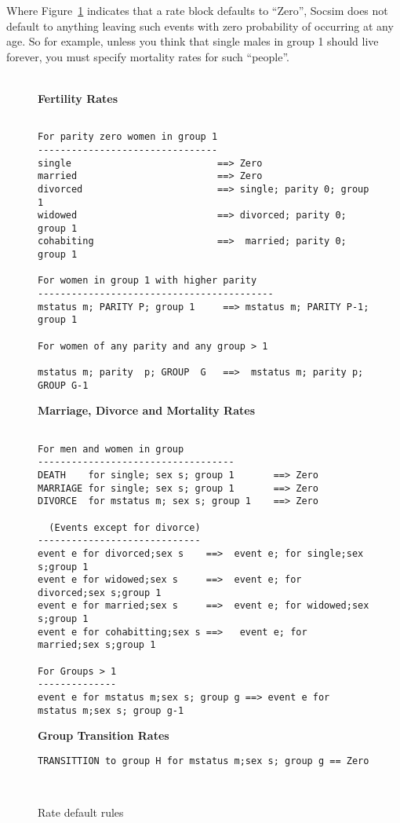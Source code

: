  Where Figure~\ref{fig:rateDefaults} indicates that a rate block
 defaults to ``Zero'', Socsim does not default to anything leaving
 such events with zero probability of occurring at any age. So for
 example, unless you think that single males in group 1 should live
 forever, you must specify mortality rates for such ``people''.
 \clearpage
\begin{figure}
  \label{fig:rateDefaults}
  \caption{Rate default rules}

\center{\rule{.5\textwidth}{.1mm}}\\
\textbf{Fertility Rates}

\begin{verbatim}
    
For parity zero women in group 1 
--------------------------------
single                          ==> Zero
married                         ==> Zero
divorced                        ==> single; parity 0; group 1
widowed                         ==> divorced; parity 0; group 1
cohabiting                      ==>  married; parity 0; group 1

For women in group 1 with higher parity
------------------------------------------
mstatus m; PARITY P; group 1     ==> mstatus m; PARITY P-1; group 1

For women of any parity and any group > 1

mstatus m; parity  p; GROUP  G   ==>  mstatus m; parity p; GROUP G-1

\end{verbatim}

\textbf{Marriage, Divorce and Mortality Rates}
\begin{verbatim}

For men and women in group
-----------------------------------
DEATH    for single; sex s; group 1       ==> Zero
MARRIAGE for single; sex s; group 1       ==> Zero
DIVORCE  for mstatus m; sex s; group 1    ==> Zero

  (Events except for divorce)
-----------------------------
event e for divorced;sex s    ==>  event e; for single;sex s;group 1  
event e for widowed;sex s     ==>  event e; for divorced;sex s;group 1  
event e for married;sex s     ==>  event e; for widowed;sex s;group 1  
event e for cohabitting;sex s ==>   event e; for married;sex s;group 1  

For Groups > 1
--------------
event e for mstatus m;sex s; group g ==> event e for mstatus m;sex s; group g-1

\end{verbatim}
\textbf{Group Transition Rates}
\begin{verbatim}
TRANSITTION to group H for mstatus m;sex s; group g == Zero
\end{verbatim}

\center{\rule{.5\textwidth}{.1mm}}\\
\end{figure}

